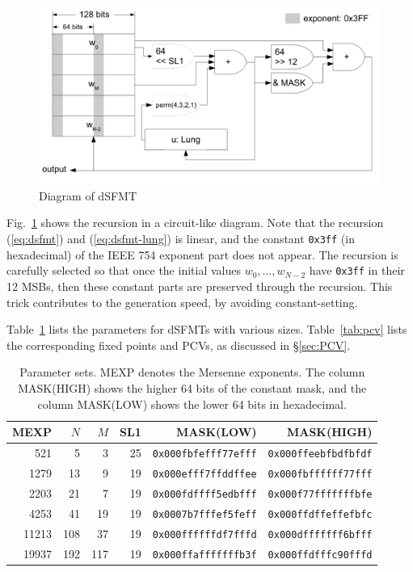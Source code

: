 \documentclass{svmult}
\begin{document}
\begin{figure}
  \centering
  \includegraphics[width=\linewidth]{Saito-fig.pdf}
  \caption{Diagram of dSFMT}
  \label{fig:dsfmt}
\end{figure}

Fig.~\ref{fig:dsfmt} shows the recursion in a circuit-like diagram.
Note that the recursion (\ref{eq:dsfmt}) and (\ref{eq:dsfmt-lung})
is linear, and the constant \texttt{0x3ff} (in hexadecimal) of the IEEE 754 exponent part
does not appear.
The recursion is carefully selected so that once
the initial values $w_0,\ldots , w_{N-2}$ have \texttt{0x3ff} in their 12 MSBs,
then these constant parts are preserved through the recursion.
This trick contributes to the generation speed, by avoiding
constant-setting.

Table~\ref{tab:params} lists the parameters
for dSFMTs with various sizes.
Table~\ref{tab:pcv} lists the corresponding fixed points and
PCVs, as discussed in \S\ref{sec:PCV}.

\begin{table}
  \begin{center}
    \caption{Parameter sets. MEXP denotes the Mersenne exponents.
      The column MASK(HIGH) shows the higher
      64 bits of the constant mask, and the column MASK(LOW) shows
      the lower 64 bits in hexadecimal.}
    \label{tab:params}
    \begin{tabular}{rrrrrr} \hline
      MEXP & $N$ & $M$ & SL1 & MASK(LOW) & MASK(HIGH) \\ \hline \hline
      521 & 5 & 3 & 25 & \texttt{0x000fbfefff77efff}
      & \texttt{0x000ffeebfbdfbfdf} \\
      1279 & 13 & 9 & 19 & \texttt{0x000efff7ffddffee}
      & \texttt{0x000fbffffff77fff} \\
      2203 & 21 & 7 & 19 & \texttt{0x000fdffff5edbfff}
      & \texttt{0x000f77fffffffbfe} \\
      4253 & 41 & 19 & 19 & \texttt{0x0007b7fffef5feff}
      & \texttt{0x000ffdffeffefbfc} \\
      11213 & 108 & 37 & 19 & \texttt{0x000ffffffdf7fffd}
      & \texttt{0x000dfffffff6bfff} \\
      19937 & 192 & 117 & 19 & \texttt{0x000ffafffffffb3f}
      & \texttt{0x000ffdfffc90fffd} \\ \hline
    \end{tabular}
  \end{center}
\end{table}
\end{document}
